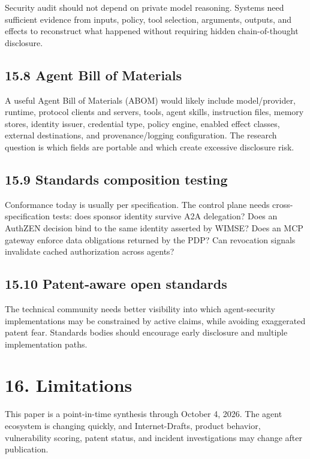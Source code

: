 \documentclass[
  10pt,
  letterpaper,
]{article}
\begin{document}
Security audit should not depend on private model reasoning. Systems
need sufficient evidence from inputs, policy, tool selection, arguments,
outputs, and effects to reconstruct what happened without requiring
hidden chain-of-thought disclosure.

\subsection{15.8 Agent Bill of Materials}\label{agent-bill-of-materials}

A useful Agent Bill of Materials (ABOM) would likely include
model/provider, runtime, protocol clients and servers, tools, agent
skills, instruction files, memory stores, identity issuer, credential
type, policy engine, enabled effect classes, external destinations, and
provenance/logging configuration. The research question is which fields
are portable and which create excessive disclosure risk.

\subsection{15.9 Standards composition
testing}\label{standards-composition-testing}

Conformance today is usually per specification. The control plane needs
cross-specification tests: does sponsor identity survive A2A delegation?
Does an AuthZEN decision bind to the same identity asserted by WIMSE?
Does an MCP gateway enforce data obligations returned by the PDP? Can
revocation signals invalidate cached authorization across agents?

\subsection{15.10 Patent-aware open
standards}\label{patent-aware-open-standards}

The technical community needs better visibility into which
agent-security implementations may be constrained by active claims,
while avoiding exaggerated patent fear. Standards bodies should
encourage early disclosure and multiple implementation paths.

\section{16. Limitations}\label{limitations}

This paper is a point-in-time synthesis through October 4, 2026. The
agent ecosystem is changing quickly, and Internet-Drafts, product
behavior, vulnerability scoring, patent status, and incident
investigations may change after publication.
\end{document}
